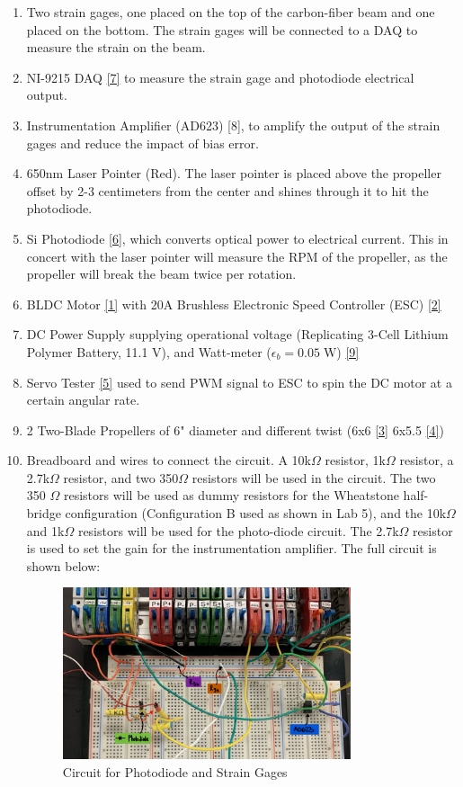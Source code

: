 \documentclass{article}
\begin{document}
\begin{enumerate}
  \item Two strain gages, one placed on the top of the carbon-fiber beam and one placed on the bottom. The strain gages will be connected to a DAQ to measure the strain on the beam.
  \item NI-9215 DAQ \hyperlink{7}{[7]} to measure the strain gage and photodiode electrical output.
  \item Instrumentation Amplifier (AD623) \hypertarget{8}{[8]}, to amplify the output of the strain gages and reduce the impact of bias error.
  \item 650nm Laser Pointer (Red). The laser pointer is placed above the propeller offset by 2-3 centimeters from the center and shines through it to hit the photodiode.
  \item Si Photodiode \hyperlink{6}{[6]}, which converts optical power to electrical current. This in concert with the laser pointer will measure the RPM of the propeller, as the propeller will break the beam twice per rotation.
  \item BLDC Motor \hyperlink{1}{[1]} with 20A Brushless Electronic Speed Controller (ESC) \hyperlink{2}{[2]} 
  \item DC Power Supply supplying operational voltage (Replicating 3-Cell Lithium Polymer Battery, 11.1 V), and Watt-meter (\(\epsilon_{b} = 0.05\; \text{W}\)) \hyperlink{9}{[9]}
  \item Servo Tester \hyperlink{5}{[5]} used to send PWM signal to ESC to spin the DC motor at a certain angular rate.
  \item 2 Two-Blade Propellers of 6" diameter and different twist (6x6 \hyperlink{3}{[3]} 6x5.5 \hyperlink{4}{[4]})
  \item Breadboard and wires to connect the circuit. A 10k$\Omega$ resistor, 1k$\Omega$ resistor, a 2.7k$\Omega$ resistor, and two 350$\Omega$ resistors will be used in the circuit. The two 350 $\Omega$ resistors will be used as dummy resistors for the Wheatstone half-bridge configuration (Configuration B used as shown in Lab 5), and the 10k$\Omega$ and 1k$\Omega$ resistors will be used for the photo-diode circuit. The 2.7k$\Omega$ resistor is used to set the gain for the instrumentation amplifier. The full circuit is shown below:
  \vspace{1mm}

  \begin{figure}[H]
    \centering
    \includegraphics[width = 0.8\textwidth]{finalprojectimages/finalsetupcircuit.jpg}
    \caption{Circuit for Photodiode and Strain Gages}
    \label{fig:finalsetupcircuit}
  \end{figure}


\end{enumerate}
\end{document}
